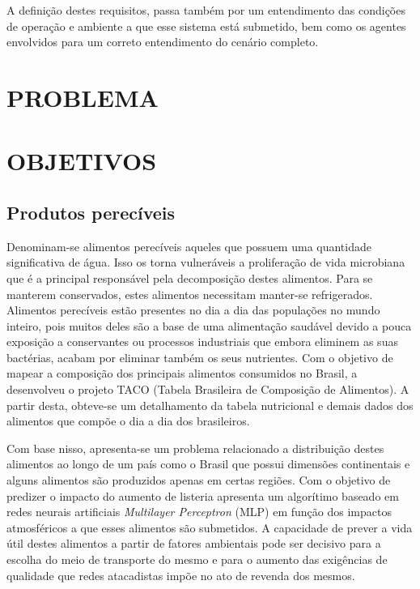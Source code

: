 A definição destes requisitos, passa também por um entendimento das condições de operação e ambiente a que esse sistema está submetido, bem como os agentes envolvidos para um correto entendimento do cenário completo.
\section{PROBLEMA}



\section{OBJETIVOS}
\subsection{Produtos perecíveis}
Denominam-se alimentos perecíveis aqueles que possuem uma quantidade significativa de água. Isso os torna vulneráveis a proliferação de vida microbiana que é a principal responsável pela decomposição destes alimentos. Para se manterem conservados, estes alimentos necessitam manter-se refrigerados.
Alimentos perecíveis estão presentes no dia a dia das populações no mundo inteiro, pois muitos deles são a base de uma alimentação saudável devido a pouca exposição a conservantes ou processos industriais que embora eliminem as suas bactérias, acabam por eliminar também os seus nutrientes.
Com o objetivo de mapear a composição dos principais alimentos consumidos no Brasil, a  desenvolveu o projeto TACO (Tabela Brasileira de Composição de Alimentos). A partir desta, obteve-se um detalhamento da tabela nutricional e demais dados dos alimentos que compõe o dia a dia dos brasileiros.

Com base nisso, apresenta-se um problema relacionado a distribuição destes alimentos ao longo de um país como o Brasil que possui dimensões continentais e alguns alimentos são produzidos apenas em certas regiões.
Com o objetivo de predizer o impacto do aumento de listeria  apresenta um algorítimo baseado em redes neurais artificiais \textit{Multilayer Perceptron} (MLP) em função dos impactos atmosféricos a que esses alimentos são submetidos. A capacidade de prever a vida útil destes alimentos a partir de fatores ambientais pode ser decisivo para a escolha do meio de transporte do mesmo e para o aumento das exigências de qualidade que redes atacadistas impõe no ato de revenda dos mesmos.

